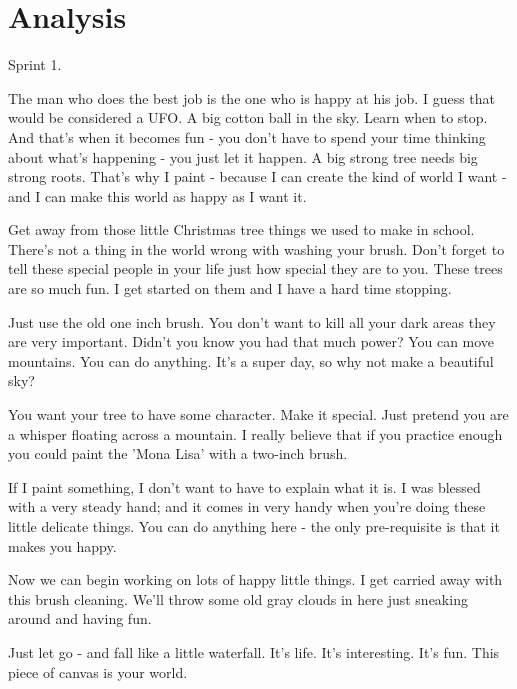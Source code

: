 \section{Analysis}\label{ch:ch2label}
Sprint 1.

The man who does the best job is the one who is happy at his job. I guess that would be considered a UFO. A big cotton ball in the sky. Learn when to stop. And that's when it becomes fun - you don't have to spend your time thinking about what's happening - you just let it happen. A big strong tree needs big strong roots. That's why I paint - because I can create the kind of world I want - and I can make this world as happy as I want it.

Get away from those little Christmas tree things we used to make in school. There's not a thing in the world wrong with washing your brush. Don't forget to tell these special people in your life just how special they are to you. These trees are so much fun. I get started on them and I have a hard time stopping.

Just use the old one inch brush. You don't want to kill all your dark areas they are very important. Didn't you know you had that much power? You can move mountains. You can do anything. It's a super day, so why not make a beautiful sky?

You want your tree to have some character. Make it special. Just pretend you are a whisper floating across a mountain. I really believe that if you practice enough you could paint the 'Mona Lisa' with a two-inch brush.

If I paint something, I don't want to have to explain what it is. I was blessed with a very steady hand; and it comes in very handy when you're doing these little delicate things. You can do anything here - the only pre-requisite is that it makes you happy.

Now we can begin working on lots of happy little things. I get carried away with this brush cleaning. We'll throw some old gray clouds in here just sneaking around and having fun.

Just let go - and fall like a little waterfall. It's life. It's interesting. It's fun. This piece of canvas is your world.

